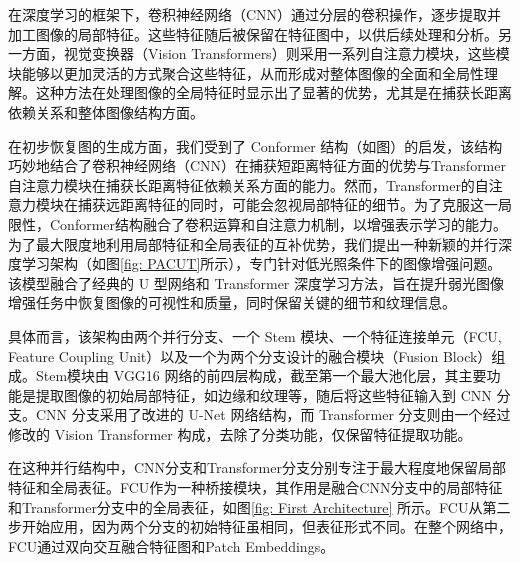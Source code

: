 \documentclass[a4paper]{ctexart}
\begin{document}
	在深度学习的框架下，卷积神经网络（CNN）通过分层的卷积操作，逐步提取并加工图像的局部特征。这些特征随后被保留在特征图中，以供后续处理和分析。另一方面，视觉变换器（Vision Transformers）则采用一系列自注意力模块，这些模块能够以更加灵活的方式聚合这些特征，从而形成对整体图像的全面和全局性理解。这种方法在处理图像的全局特征时显示出了显著的优势，尤其是在捕获长距离依赖关系和整体图像结构方面。
	
	在初步恢复图的生成方面，我们受到了 Conformer 结构\cite{peng2021conformer}（如图）的启发，该结构巧妙地结合了卷积神经网络（CNN）在捕获短距离特征\cite{jain1991unsupervised, lowe2004distinctive, ojala2002multiresolution}方面的优势与Transformer自注意力模块在捕获长距离特征\cite{lisin2005combining}依赖关系方面的能力。然而，Transformer的自注意力模块在捕获远距离特征的同时，可能会忽视局部特征的细节。为了克服这一局限性，Conformer结构融合了卷积运算和自注意力机制，以增强表示学习的能力。为了最大限度地利用局部特征和全局表征的互补优势，我们提出一种新颖的并行深度学习架构（如图\ref{fig: PACUT}所示），专门针对低光照条件下的图像增强问题。该模型融合了经典的 U 型网络和 Transformer 深度学习方法，旨在提升弱光图像增强任务中恢复图像的可视性和质量，同时保留关键的细节和纹理\cite{karu1996there}信息。
	
	具体而言，该架构由两个并行分支、一个 Stem 模块、一个特征连接单元（FCU, Feature Coupling Unit）以及一个为两个分支设计的融合模块（Fusion Block）组成。Stem模块由 VGG16 网络的前四层构成，截至第一个最大池化层，其主要功能是提取图像的初始局部特征，如边缘和纹理等，随后将这些特征输入到 CNN 分支。CNN 分支采用了改进的 U-Net 网络结构，而 Transformer 分支则由一个经过修改的 Vision Transformer 构成，去除了分类功能，仅保留特征提取功能。
	
	在这种并行结构中，CNN分支和Transformer分支分别专注于最大程度地保留局部特征和全局表征。FCU作为一种桥接模块，其作用是融合CNN分支中的局部特征和Transformer分支中的全局表征，如图\ref{fig: First Architecture} 所示。FCU从第二步开始应用，因为两个分支的初始特征虽相同，但表征形式不同。在整个网络中，FCU通过双向交互融合特征图和Patch Embeddings。
	
\end{document}

